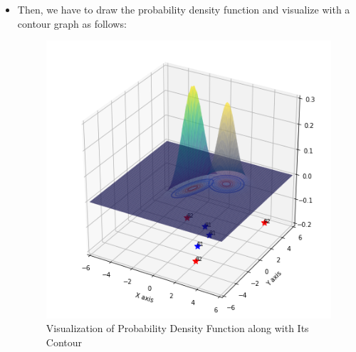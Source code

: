 \documentclass[conference]{IEEEtran}
\begin{document}
\begin{itemize}
\item Then, we have to draw the probability density function and visualize with a contour graph as follows:\\
\begin{figure}[htb!]
\centerline{\includegraphics[scale=0.4673]{32.png}}
\caption{Visualization of Probability Density Function along with Its Contour\\}
\label{fig}
\end{figure}


\end{itemize}
\end{document}
